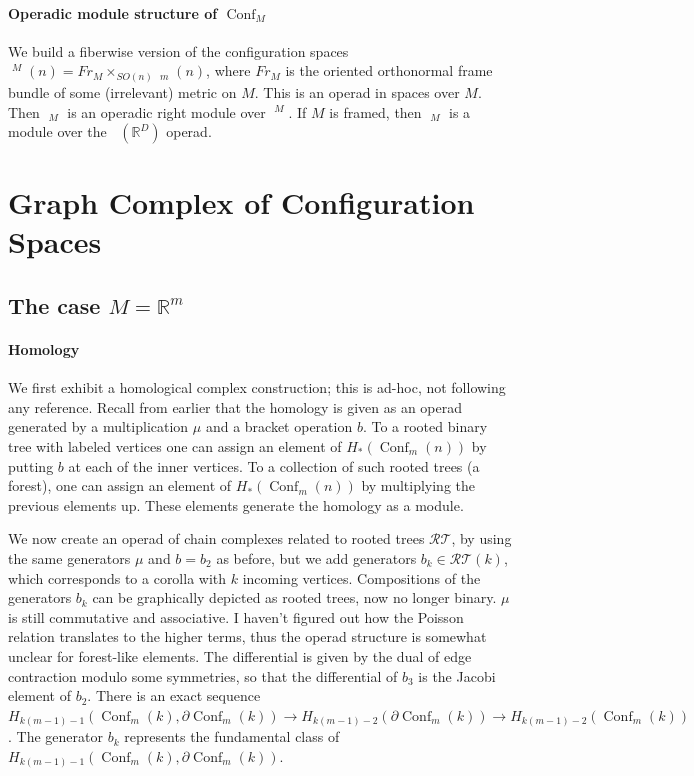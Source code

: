 \documentclass{scrartcl}
\theoremstyle{plain}
\theoremstyle{definition}
\newcommand{\R}{\mathbb R}
\DeclareMathOperator{\Conf}{Conf}
\DeclareMathOperator{\cConf}{\overline{Conf}}
\begin{document}
\paragraph{Operadic module structure of $\Conf_M$} We build a fiberwise version of the configuration spaces $\cConf^M(n) = Fr_M\times_{SO(n)} \cConf_m(n)$, where $Fr_M$ is the oriented orthonormal frame bundle of some (irrelevant) metric on $M$. This is an operad in spaces over $M$. Then $\cConf_M$ is an operadic right module over $\cConf^M$. If $M$ is framed, then $\cConf_M$ is a module over the $\cConf(\R^D)$ operad.






\section{Graph Complex of Configuration Spaces}

\subsection{The case $M=\R^m$}

\paragraph{Homology} We first exhibit a homological complex construction; this is ad-hoc, not following any reference. Recall from earlier that the homology is given as an operad generated by a multiplication $\mu$ and a bracket operation $b$. To a rooted binary tree with labeled vertices one can assign an element of $H_*(\Conf_m(n))$ by putting $b$ at each of the inner vertices. To a collection of such rooted trees (a forest), one can assign an element of $H_*(\Conf_m(n))$ by multiplying the previous elements up. These elements generate the homology as a module. 

We now create an operad of chain complexes related to rooted trees $\mathcal{RT}$, by using the same generators $\mu$ and $b=b_2$ as before, but we add generators $b_k\in\mathcal{RT}(k)$, which corresponds to a corolla with $k$ incoming vertices. Compositions of the generators $b_k$ can be graphically depicted as rooted trees, now no longer binary. $\mu$ is still commutative and associative. I haven't figured out how the Poisson relation translates to the higher terms, thus the operad structure is somewhat unclear for forest-like elements. The differential is given by the dual of edge contraction modulo some symmetries, so that the differential of $b_3$ is the Jacobi element of $b_2$. There is an exact sequence $H_{k(m-1)-1}(\Conf_m(k), \partial\Conf_m(k)) \to H_{k(m-1)-2}(\partial\Conf_m(k)) \to H_{k(m-1)-2}(\Conf_m(k))$. The generator $b_k$ represents the fundamental class of $H_{k(m-1)-1}(\Conf_m(k), \partial\Conf_m(k))$.
\end{document}
